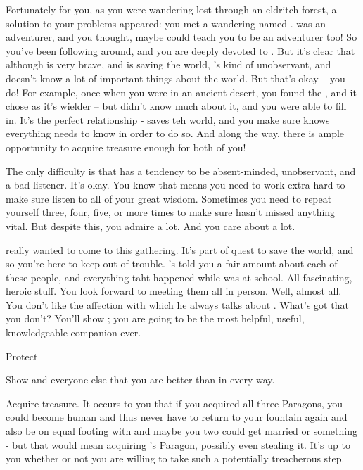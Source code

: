 \documentclass[char]{Katmeers}
\begin{document}
Fortunately for you, as you were wandering lost through an eldritch forest, a solution to your problems appeared: you met a wandering \cNeville{\magician} named \cNeville{}. \cNeville{\they} was an adventurer, and you thought, maybe \cNeville{\they} could teach you to be an adventurer too! So you've been following \cNeville{\them} around, and you are deeply devoted to \cNeville{\them}. But it's clear that although \cNeville{} is very brave, and is saving the world, \cNeville{}'s kind of unobservant, and doesn't know a lot of important things about the world. But that's okay -- you do! For example, once when you were in an ancient desert, you found the \iWisdom{\MYname}, and it chose \cNeville{\them} as it's wielder -- but \cNeville{\they} didn't know much about it, and you were able to fill \cNeville{\them} in. It's the perfect relationship - \cNeville{\they} saves teh world, and you make sure \cNeville{\they} knows everything \cNeville{\they} needs to know in order to do so. And along the way, there is ample opportunity to acquire treasure enough for both of you!

The only difficulty is that \cNeville{} has a tendency to be absent-minded, unobservant, and a bad listener. It's okay. You know that means you need to work extra hard to make sure \cNeville{\they} listen to all of your great wisdom. Sometimes you need to repeat yourself three, four, five, or more times to make sure \cNeville{\they} hasn't missed anything vital. But despite this, you admire \cNeville{\them} a lot. And you care about \cNeville{\them} a lot.

\cNeville{\They} really wanted to come to this gathering. It's part of \cNeville{\their} quest to save the world, and so you're here to keep \cNeville{\them} out of trouble. \cNeville{\They}'s told you a fair amount about each of these people, and everything taht happened while \cNeville{} was at school. All fascinating, heroic stuff. You look forward to meeting them all in person. Well, almost all. You don't like the affection with which he always talks about \cGinny{}. What's \cGinny{\they} got that you don't? You'll show \cGinny{\them}; you are going to be the most helpful, useful, knowledgeable companion ever.

\begin{itemz}[Goals]
	\item Protect \cNeville{}
	\item Show \cNeville{} and everyone else that you are better than \cGinny{} in every way.
	\item Acquire treasure. It occurs to you that if you acquired all three Paragons, you could become human and thus never have to return to your fountain again and also be on equal footing with \cNeville{} and maybe you two could get married or something - but that would mean acquiring \cNeville{}'s Paragon, possibly even stealing it. It's up to you whether or not you are willing to take such a potentially treacherous step.
\end{itemz}
\end{document}
